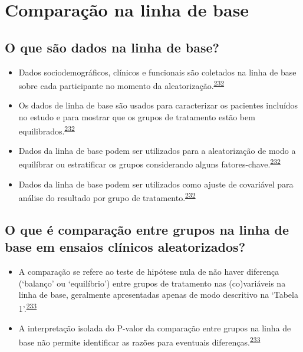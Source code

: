 \documentclass[
  a4paper,
]{book}
\begin{document}
\hypertarget{comparacao-linha-de-base}{%
\section{Comparação na linha de base}\label{comparacao-linha-de-base}}

\hypertarget{o-que-suxe3o-dados-na-linha-de-base}{%
\subsection{O que são dados na linha de base?}\label{o-que-suxe3o-dados-na-linha-de-base}}

\begin{itemize}
\item
  Dados sociodemográficos, clínicos e funcionais são coletados na linha de base sobre cada participante no momento da aleatorização.\textsuperscript{\protect\hyperlink{ref-Assmann2000}{232}}
\item
  Os dados de linha de base são usados para caracterizar os pacientes incluídos no estudo e para mostrar que os grupos de tratamento estão bem equilibrados.\textsuperscript{\protect\hyperlink{ref-Assmann2000}{232}}
\item
  Dados da linha de base podem ser utilizados para a aleatorização de modo a equilíbrar ou estratificar os grupos considerando alguns fatores-chave.\textsuperscript{\protect\hyperlink{ref-Assmann2000}{232}}
\item
  Dados da linha de base podem ser utilizados como ajuste de covariável para análise do resultado por grupo de tratamento.\textsuperscript{\protect\hyperlink{ref-Assmann2000}{232}}
\end{itemize}

\hypertarget{o-que-uxe9-comparauxe7uxe3o-entre-grupos-na-linha-de-base-em-ensaios-cluxednicos-aleatorizados}{%
\subsection{O que é comparação entre grupos na linha de base em ensaios clínicos aleatorizados?}\label{o-que-uxe9-comparauxe7uxe3o-entre-grupos-na-linha-de-base-em-ensaios-cluxednicos-aleatorizados}}

\begin{itemize}
\item
  A comparação se refere ao teste de hipótese nula de não haver diferença (`balanço' ou `equilíbrio') entre grupos de tratamento nas (co)variáveis na linha de base, geralmente apresentadas apenas de modo descritivo na `Tabela 1'.\textsuperscript{\protect\hyperlink{ref-Stang2018}{233}}
\item
  A interpretação isolada do P-valor da comparação entre grupos na linha de base não permite identificar as razões para eventuais diferenças.\textsuperscript{\protect\hyperlink{ref-Stang2018}{233}}
\end{itemize}
\end{document}
